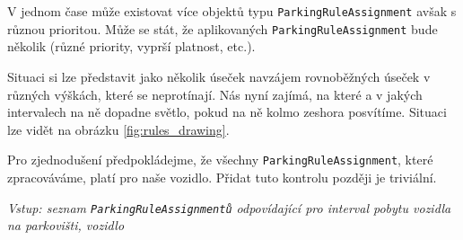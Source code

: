 V jednom čase může existovat více objektů typu \texttt{ParkingRuleAssignment} avšak s různou prioritou.
Může se stát, že aplikovaných \texttt{ParkingRuleAssignment} bude několik (různé priority, vyprší platnost, etc.).

Situaci si lze představit jako několik úseček navzájem rovnoběžných úseček v různých výškách, které se neprotínají.
Nás nyní zajímá, na které a v jakých intervalech na ně dopadne světlo, pokud na ně kolmo zeshora posvítíme.
Situaci lze vidět na obrázku \ref{fig:rules_drawing}.

Pro zjednodušení předpokládejme, že všechny \texttt{ParkingRuleAssignment}, které zpracováváme, platí pro naše vozidlo.
Přidat tuto kontrolu později je triviální.

\textit{Vstup: seznam \texttt{ParkingRuleAssignmentů} odpovídající pro interval pobytu vozidla na parkovišti, vozidlo}

